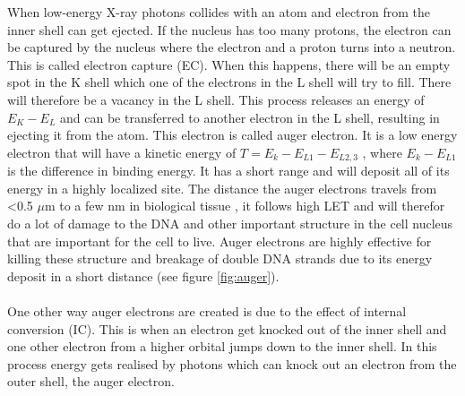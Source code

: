 \documentclass[twoside,english]{uiofysmaster/uiofysmaster}
\begin{document}
When low-energy X-ray photons collides with an atom and electron from the inner shell can get ejected. If the nucleus has too many protons, the electron can be captured by the nucleus where the electron and a proton turns into a neutron. This is called electron capture (EC). When this happens, there will be an empty spot in the K shell which one of the electrons in the L shell will try to fill. There will therefore be a vacancy in the L shell. This process releases an energy of $E_K - E_{L}$ and can be transferred to another electron in the L shell, resulting in ejecting it from the atom. This electron is called auger electron. It is a low energy electron that will have a kinetic energy of $T = E_k - E_{L1} - E_{L2,3}$ \cite{medical}, where $E_k - E_{L1}$ is the difference in binding energy. It has a short range and will deposit all of its energy in a highly localized site. The distance the auger electrons travels from <0.5 $\mu$m to a few nm in biological tissue \cite{augerelectrons}, it follows high LET and will therefor do a lot of damage to the DNA and other important structure in the cell nucleus that are important for the cell to live. Auger electrons are highly effective for killing these structure and breakage of double DNA strands due to its energy deposit in a short distance (see figure \ref{fig:auger}).\\
\noindent
\\
One other way auger electrons are created is due to the effect of internal conversion (IC). This is when an electron get knocked out of the inner shell and one other electron from a higher orbital jumps down to the inner shell. In this process energy gets realised by photons which can knock out an electron from the outer shell, the auger electron. 
\\
\\
\end{document}
